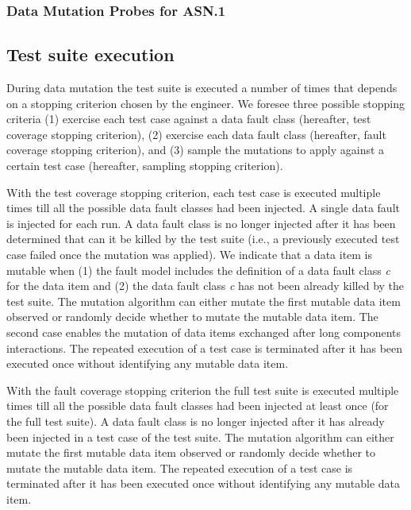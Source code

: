 


\subsubsection{Data Mutation Probes for ASN.1}
\label{sec:FAQASDataMutationProbesASN}


\clearpage
\subsection{Test suite execution}
\label{sec:mutantsExecution}

During data mutation the test suite is executed a number of times that depends on a stopping criterion chosen by the engineer. We foresee three possible stopping criteria (1) exercise each test case against a data fault class (hereafter, test coverage stopping criterion), (2) 
exercise each data fault class (hereafter, fault coverage stopping criterion), and (3) sample the mutations to apply against a certain test case (hereafter, sampling stopping criterion).


With the test coverage stopping criterion, each test case is executed multiple times till all the possible data fault classes had been injected.
A single data fault is injected for each run.
A data fault class is no longer injected after it has been determined that can it be killed by the test suite (i.e., a previously executed test case failed once the mutation was applied).
We indicate that a data item is mutable when (1) the fault model includes the definition of a data fault class \emph{c} for the data item and (2) the data fault class \emph{c} has not been already killed by the test suite.
The mutation algorithm can either mutate the first mutable data item observed or randomly decide whether to mutate the mutable data item. The second case enables the mutation of data items exchanged after long components interactions.
The repeated execution of a test case is terminated after it has been executed once without identifying any mutable data item.

With the fault coverage stopping criterion the full test suite is executed multiple times till all the possible data fault classes had been injected at least once (for the full test suite).
A data fault class is no longer injected after it has already been injected in a test case of the test suite.
The mutation algorithm can either mutate the first mutable data item observed or randomly decide whether to mutate the mutable data item.
The repeated execution of a test case is terminated after it has been executed once without identifying any mutable data item.

